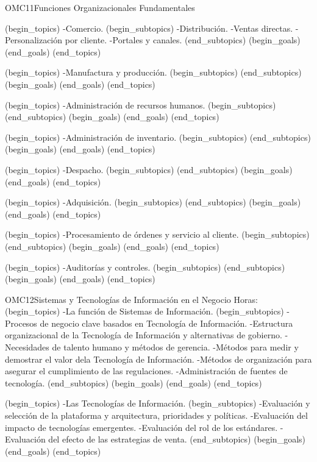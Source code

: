 \begin{BKL2}{OMC11}{Funciones Organizacionales Fundamentales}
 
(begin_topics)
-Comercio.
(begin_subtopics)
-Distribución.
-Ventas directas.
-Personalización por cliente.
-Portales y canales.
(end_subtopics)
(begin_goals)
(end_goals)
(end_topics)

 

(begin_topics)
-Manufactura y producción.
(begin_subtopics)
(end_subtopics)
(begin_goals)
(end_goals)
(end_topics)

 
(begin_topics)
-Administración de recursos humanos.
(begin_subtopics)
(end_subtopics)
(begin_goals)
(end_goals)
(end_topics)

 

(begin_topics)
-Administración de inventario.
(begin_subtopics)
(end_subtopics)
(begin_goals)
(end_goals)
(end_topics)

 

(begin_topics)
-Despacho.
(begin_subtopics)
(end_subtopics)
(begin_goals)
(end_goals)
(end_topics)

 

(begin_topics)
-Adquisición.
(begin_subtopics)
(end_subtopics)
(begin_goals)
(end_goals)
(end_topics)

 
(begin_topics)
-Procesamiento de órdenes y servicio al cliente.
(begin_subtopics)
(end_subtopics)
(begin_goals)
(end_goals)
(end_topics)

 

(begin_topics)
-Auditorías y controles.
(begin_subtopics)
(end_subtopics)
(begin_goals)
(end_goals)
(end_topics)

\end{BKL2}



\begin{BKL2}{OMC12}{Sistemas y Tecnologías de Información en el Negocio}
Horas:
(begin_topics)
-La función de Sistemas de Información.
(begin_subtopics)
-Procesos de negocio clave basados en Tecnología de Información.
-Estructura organizacional de la Tecnología de Información y alternativas de gobierno.
-Necesidades de talento humano y métodos de gerencia.
-Métodos para medir y demostrar el valor dela Tecnología de Información.
-Métodos de organización para asegurar el cumplimiento de las regulaciones.
-Administración de fuentes de tecnología.
(end_subtopics)
(begin_goals)
(end_goals)
(end_topics)

(begin_topics)
-Las Tecnologías de Información.
(begin_subtopics)
-Evaluación y selección de la plataforma y arquitectura, prioridades y políticas.
-Evaluación del impacto de tecnologías emergentes.
-Evaluación del rol de los estándares.
-Evaluación del efecto de las estrategias de venta.
(end_subtopics)
(begin_goals)
(end_goals)
(end_topics)

\end{BKL2}

